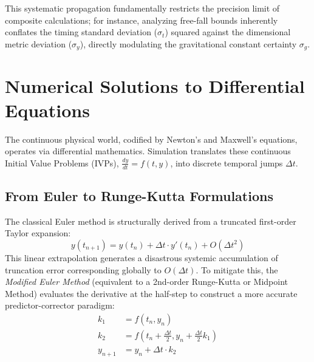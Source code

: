 \documentclass[aps, reprint, twocolumn, superscriptaddress, floatfix]{revtex4-2}
\begin{document}
This systematic propagation fundamentally restricts the precision limit of composite calculations; for instance, analyzing free-fall bounds inherently conflates the timing standard deviation ($\sigma_t$) squared against the dimensional metric deviation ($\sigma_y$), directly modulating the gravitational constant certainty $\sigma_g$.

\section{Numerical Solutions to Differential Equations}

The continuous physical world, codified by Newton's and Maxwell's equations, operates via differential mathematics. Simulation translates these continuous Initial Value Problems (IVPs), $\frac{dy}{dt} = f(t, y)$, into discrete temporal jumps $\Delta t$.

\subsection{From Euler to Runge-Kutta Formulations}
The classical Euler method is structurally derived from a truncated first-order Taylor expansion:
\begin{equation}
    y(t_{n+1}) = y(t_n) + \Delta t \cdot y'(t_n) + O(\Delta t^2)
\end{equation}
This linear extrapolation generates a disastrous systemic accumulation of truncation error corresponding globally to $O(\Delta t)$. To mitigate this, the \textit{Modified Euler Method} (equivalent to a 2nd-order Runge-Kutta or Midpoint Method) evaluates the derivative at the half-step to construct a more accurate predictor-corrector paradigm:
\begin{equation}
\begin{aligned}
    k_1 &= f(t_n, y_n) \\
    k_2 &= f\left(t_n + \frac{\Delta t}{2}, y_n + \frac{\Delta t}{2} k_1 \right) \\
    y_{n+1} &= y_n + \Delta t \cdot k_2 
\end{aligned}
\end{equation}
\end{document}
